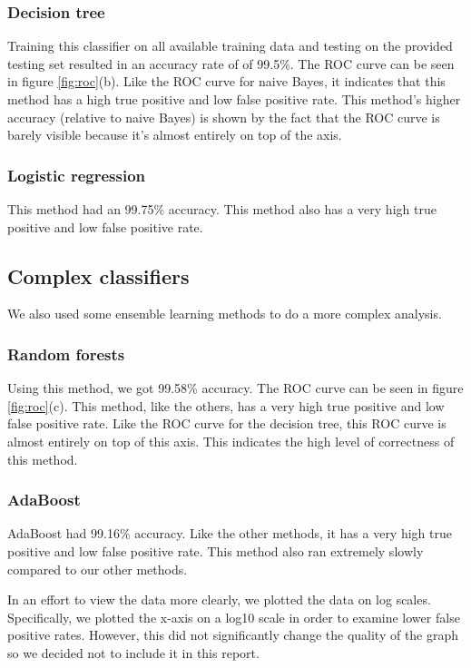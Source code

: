 \documentclass{article} %
\begin{document}
\subsubsection{Decision tree}
Training this classifier on all available training data and testing on the provided testing set resulted in an accuracy rate of of 99.5\%. The ROC curve can be seen in figure \ref{fig:roc}(b). Like the ROC curve for naive Bayes, it indicates that this method has a high true positive and low false positive rate. This method's higher accuracy (relative to naive Bayes) is shown by the fact that the ROC curve is barely visible because it's almost entirely on top of the axis.

\subsubsection{Logistic regression}
This method had an 99.75\% accuracy. This method also has a very high true positive and low false positive rate. 

\subsection{Complex classifiers}
We also used some ensemble learning methods to do a more complex analysis. 

\subsubsection{Random forests}
Using this method, we got 99.58\% accuracy. The ROC curve can be seen in figure \ref{fig:roc}(c). This method, like the others, has a very high true positive and low false positive rate. Like the ROC curve for the decision tree, this ROC curve is almost entirely on top of this axis. This indicates the high level of correctness of this method. 

\subsubsection{AdaBoost}
AdaBoost had 99.16\% accuracy. Like the other methods, it has a very high true positive and low false positive rate. This method also ran extremely slowly compared to our other methods. 

In an effort to view the data more clearly, we plotted the data on log scales. Specifically, we plotted the x-axis on a log10 scale in order to examine lower false positive rates. However, this did not significantly change the quality of the graph so we decided not to include it in this report. 
\end{document}
